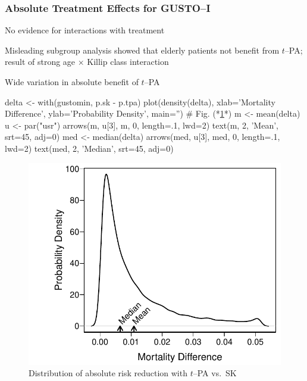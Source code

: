\subsubsection{Absolute Treatment Effects for GUSTO--I}
\bi
\item   No evidence for interactions with treatment
\item   Misleading subgroup analysis showed that elderly patients not
        benefit from $t$--PA; result of strong age $\times$ Killip
        class interaction
\item   Wide variation in absolute benefit of $t$--PA \ipacue
\begin{Schunk}
\begin{Sinput}
delta <- with(gustomin, p.sk - p.tpa)
plot(density(delta), xlab='Mortality Difference',
     ylab='Probability Density', main='')    # Fig. (*\ref{fig:ancova-gusto-histdelt}*)
m <- mean(delta)
u <- par("usr")
arrows(m, u[3], m, 0, length=.1, lwd=2)
text(m, 2, 'Mean', srt=45, adj=0)
med <- median(delta)
arrows(med, u[3], med, 0, length=.1, lwd=2)
text(med, 2, 'Median', srt=45, adj=0)
\end{Sinput}
\begin{figure}[htbp]

\centerline{\includegraphics[width=\maxwidth]{ancova-gusto-histdelt-1} }

\caption[Absolute benefit vs.\ baseline risk]{Distribution of absolute risk reduction with $t$--PA vs.\ SK}\label{fig:ancova-gusto-histdelt}
\end{figure}
\end{Schunk}
